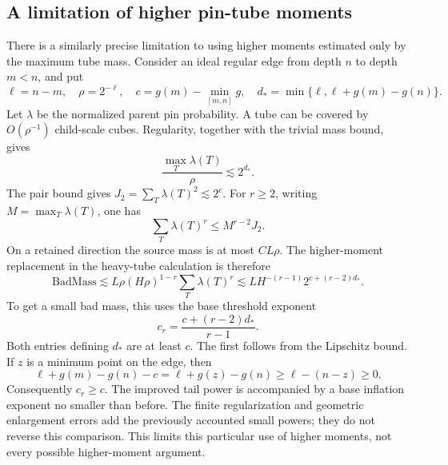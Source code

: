 \subsection{A limitation of higher pin-tube moments}
There is a similarly precise limitation to using higher moments estimated
only by the maximum tube mass. Consider an ideal regular edge from depth
\(n\) to depth \(m<n\), and put
\[
 \ell=n-m,\quad\rho=2^{-\ell},\quad
 c=g(m)-\min_{[m,n]}g,\quad
 d_* =\min\{\ell,\ell+g(m)-g(n)\}.
\]
Let \(\lambda\) be the normalized parent pin probability. A tube can be
covered by \(O(\rho^{-1})\) child-scale cubes. Regularity, together with
the trivial mass bound, gives
\[
 \frac{\max_T\lambda(T)}\rho\lesssim2^{d_*}.
\]
The pair bound gives \(J_2=\sum_T\lambda(T)^2\lesssim2^c\).
For \(r\ge2\), writing \(M=\max_T\lambda(T)\), one has
\[
 \sum_T\lambda(T)^r\le M^{r-2}J_2.
\]
On a retained direction the source mass is at most \(CL\rho\).
The higher-moment replacement in the heavy-tube calculation is therefore
\[
 \mathrm{BadMass}\lesssim
 L\rho(H\rho)^{1-r}\sum_T\lambda(T)^r
 \lesssim LH^{-(r-1)}2^{c+(r-2)d_*}.
\]
To get a small bad mass, this uses the base threshold exponent
\[
 c_r=\frac{c+(r-2)d_*}{r-1}.
\]
Both entries defining \(d_*\) are at least \(c\). The first follows
from the Lipschitz bound. If \(z\) is a minimum point on the edge, then
\[
 \ell+g(m)-g(n)-c
 =\ell+g(z)-g(n)\ge\ell-(n-z)\ge0.
\]
Consequently \(c_r\ge c\). The improved tail power is accompanied by a
base inflation exponent no smaller than before. The finite regularization
and geometric enlargement errors add the previously accounted small powers;
they do not reverse this comparison. This limits this particular use of
higher moments, not every possible higher-moment argument.
